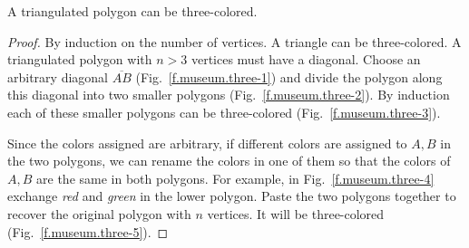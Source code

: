 \begin{theorem}
A triangulated polygon can be three-colored.\label{thm.colored}
\end{theorem}

\begin{proof}
By induction on the number of vertices. A triangle can be three-colored. A triangulated polygon with $n>3$ vertices must have a diagonal. Choose an arbitrary diagonal $\overline{AB}$ (Fig.~\ref{f.museum.three-1}) and divide the polygon along this diagonal into two smaller polygons (Fig.~\ref{f.museum.three-2}). By induction each of these smaller polygons can be three-colored (Fig.~\ref{f.museum.three-3}).

Since the colors assigned are arbitrary, if different colors are assigned to $A,B$ in the two polygons, we can rename the colors in one of them so that the colors of $A,B$ are the same in both polygons. For example, in Fig.~\ref{f.museum.three-4} exchange \emph{red} and \emph{green} in the lower polygon.
Paste the two polygons together to recover the original polygon with $n$ vertices. It will be three-colored (Fig.~\ref{f.museum.three-5}).
\end{proof}

